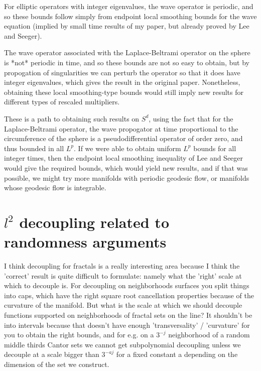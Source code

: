 \documentclass[11pt]{article}
\begin{document}
    For elliptic operators with integer eigenvalues, the wave operator is periodic, and so these bounds follow simply from endpoint local smoothing bounds for the wave equation (implied by small time results of my paper, but already proved by Lee and Seeger).

    The wave operator associated with the Laplace-Beltrami operator on the sphere is *not* periodic in time, and so these bounds are not so easy to obtain, but by propogation of singularities we can perturb the operator so that it does have integer eigenvalues, which gives the result in the original paper. Nonetheless, obtaining these local smoothing-type bounds would still imply new results for different types of rescaled multipliers.

    These is a path to obtaining such results on $S^d$, using the fact that for the Laplace-Beltrami operator, the wave propogator at time proportional to the circumference of the sphere is a pseudodifferential operator of order zero, and thus bounded in all $L^p$. If we were able to obtain uniform $L^p$ bounds for all integer times, then the endpoint local smoothing inequality of Lee and Seeger would give the required bounds, which would yield new results, and if that was possible, we might try more manifolds with periodic geodesic flow, or manifolds whose geodesic flow is integrable.

\section{$l^2$ decoupling related to randomness arguments}

    I think decoupling for fractals is a really interesting area because I think the 'correct' result is quite difficult to formulate: namely what the 'right' scale at which to decouple is. For decoupling on neighborhoods surfaces you split things into caps, which have the right square root cancellation properties because of the curvature of the manifold. But what is the scale at which we should decouple functions supported on neighborhoods of fractal sets on the line? It shouldn't be into intervals because that doesn't have enough 'transversality' / 'curvature' for you to obtain the right bounds, and for e.g. on a $3^{-j}$ neighborhood of a random middle thirds Cantor sets we cannot get subpolynomial decoupling unless we decouple at a scale bigger than $3^{-aj}$ for a fixed constant a depending on the dimension of the set we construct.
\end{document}
